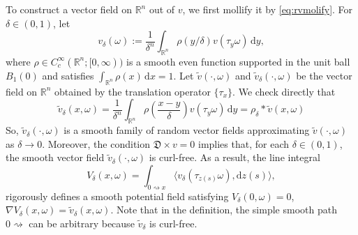 \documentclass[11pt,reqno]{amsart}
\theoremstyle{definition}
\theoremstyle{remark}
\numberwithin{equation}{section}
\newcommand{\R}{{\mathbb{R}}}
\newcommand{\dd}{\mathrm{d}}
\begin{document}
\medskip 

To construct a vector field on $\R^n$ out of $v$, we first mollify it by \eqref{eq:rvmolify}. For $\delta \in (0,1)$, let
\begin{equation}\label{Mvcov}
    v_{\delta}(\omega) := \frac{1}{\delta^n} \int_{\mathbb{R}^n} \rho(y/\delta)v(\tau_y\omega)\,\dd y, 
\end{equation}
where $\rho\in C^\infty_c(\R^n;[0,\infty))$ is a smooth even function supported in the unit ball $B_1(0)$ and satisfies $\int_{\mathbb{R}^n} \rho (x)\,\mathrm{d}x =1$. Let $\widetilde v(\cdot,\omega)$ and $\widetilde v_\delta(\cdot,\omega)$ be the vector field on $\R^n$ obtained by the translation operator $\{\tau_x\}$. We check directly that 
\begin{equation*}
    \widetilde{v}_\delta(x,\omega) = \frac{1}{\delta^n} \int_{\R^n} \rho\left(\frac{x-y}{\delta}\right) v(\tau_y\omega)\,\dd y = \rho_\delta * \widetilde{v}(x,\omega)
\end{equation*}
So, $\widetilde v_\delta(\cdot,\omega)$ is a smooth family of random vector fields approximating $\widetilde{v}(\cdot,\omega)$ as $\delta \to 0$. Moreover, the condition $\mathfrak{D}\times v = 0$ implies that, for each $\delta\in (0,1)$, the smooth vector field $\widetilde{v}_\delta(\cdot,\omega)$ is curl-free. As a result, the line integral
\begin{equation}\label{Mpot}
    V_{\delta}(x,\omega) = \int_{0 \rightsquigarrow x}\langle v_{\delta}(\tau_{z(s)}\omega), \mathrm{d}z(s)\rangle,
\end{equation}
rigorously defines a smooth potential field satisfying $V_\delta(0,\omega) = 0$, $\nabla V_\delta(x,\omega) = \widetilde{v}_\delta(x,\omega)$. Note that in the definition, the simple smooth path $0\rightsquigarrow$ can be arbitrary because $\widetilde{v}_\delta$ is curl-free.
\end{document}
